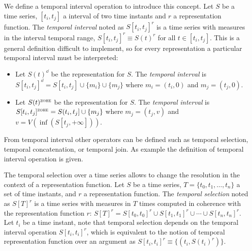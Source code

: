 %
%


We define a temporal interval operation to introduce this concept.
Let $S$ be a time series, $[t_i,t_j]$ a interval of two time instants
and $r$ a representation function. The \emph{temporal interval} noted
as $S[t_i,t_j]^r$ is a time series with measures in the interval
temporal range, $S[t_i,t_j]^r\equiv S(t)^r$ for all $t \in [t_i,t_j]$. This
is a general definition difficult to implement, so for every
representation a particular temporal interval must be interpreted:

\begin{itemize}
\item Let $S(t)^\dd$ be the \dd{} representation for $S$. The
  \emph{\dd{} temporal interval} is $S[t_i,t_j]^\dd = S[t_i,t_j]
  \cup \{m_i\} \cup \{m_j\}$ where $m_i=(t_i,0)$ and $m_j=(t_j,0)$.

\item Let $S(t)^\zohe{}$ be the \zohe{} representation for $S$. The
  \emph{\zohe{} temporal interval} is $S[t_i,t_j]^\zohe{} = S(t_i,t_j]
  \cup \{m_j\}$ where $m_j=(t_j,v)$ and $v= V(\inf( S[t_j,+\infty] ))$.
\end{itemize}



From temporal interval other operators can be defined such as temporal
selection, temporal concatenation, or temporal join. As example the
definition of temporal interval operation is given.


The temporal selection over a time series allows to change the
resolution in the context of a representation function.  Let $S$ be a
time series, $T=\{t_0,t_1,\dotsc,t_n\}$ a set of time instants, and
$r$ a representation function. The \emph{temporal selection} noted as
$S[T]^r$ is a time series with measures in $T$ times computed in
coherence with the representation function $r$: $S[T]^r = S[t_0,t_0]^r
\cup S[t_1,t_1]^r \cup \dotsb \cup S[t_n,t_n]^r$. Let $t_i$ be a time
instant, note that temporal selection depends on the temporal interval
operation $S[t_i,t_i]^r$, which is equivalent to the notion of
temporal representation function over an argument as $S[t_i,t_i]^r
\equiv \{ (t_i, S(t_i)^r) \}$.


